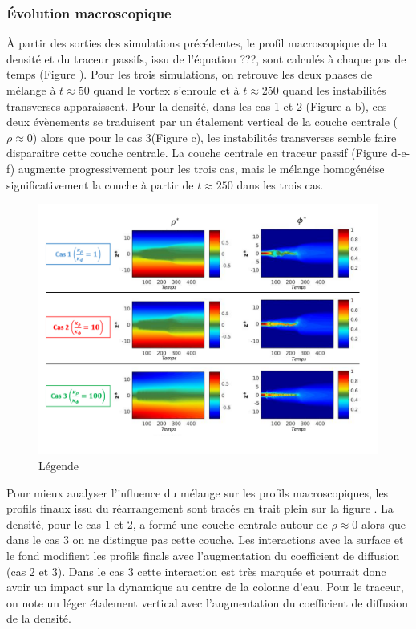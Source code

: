 \documentclass[a4paper,12pt]{article}
\begin{document}
    \subsubsection{Évolution macroscopique}
    
    À partir des sorties des simulations précédentes, le profil macroscopique de la densité et du traceur passifs, issu de l'équation ???, sont calculés à chaque pas de temps (Figure ). Pour les trois simulations, on retrouve les deux phases de mélange à $t\approx50$ quand le vortex s'enroule et à $t\approx250$ quand les instabilités transverses apparaissent. Pour la densité, dans les cas 1 et 2 (Figure a-b), ces deux évènements se traduisent par un étalement vertical de la couche centrale ($\rho\approx 0$) alors que pour le cas 3(Figure c), les instabilités transverses semble faire disparaitre cette couche centrale. La couche centrale en traceur passif (Figure d-e-f) augmente progressivement pour les trois cas, mais le mélange homogénéise significativement la couche à partir de $t\approx 250$ dans les trois cas. 
    \\
    \begin{figure}[!h]
        \centering
        \label{rhodiff_star}
        \includegraphics[width=0.9\linewidth]{figures/rhodiff_star.png}
        \caption{Légende}
    \end{figure}
    Pour mieux analyser l'influence du mélange sur les profils macroscopiques, les profils finaux issu du réarrangement sont tracés en trait plein sur la figure . La densité, pour le cas 1 et 2, a formé une couche centrale autour de $\rho\approx0$ alors que dans le cas 3 on ne distingue pas cette couche. Les interactions avec la surface et le fond modifient les profils finals avec l'augmentation du coefficient de diffusion (cas 2 et 3). Dans le cas 3 cette interaction est très marquée et pourrait donc avoir un impact sur la dynamique au centre de la colonne d'eau. Pour le traceur, on note un léger étalement vertical avec l'augmentation du coefficient de diffusion de la densité.\\ 
\end{document}
